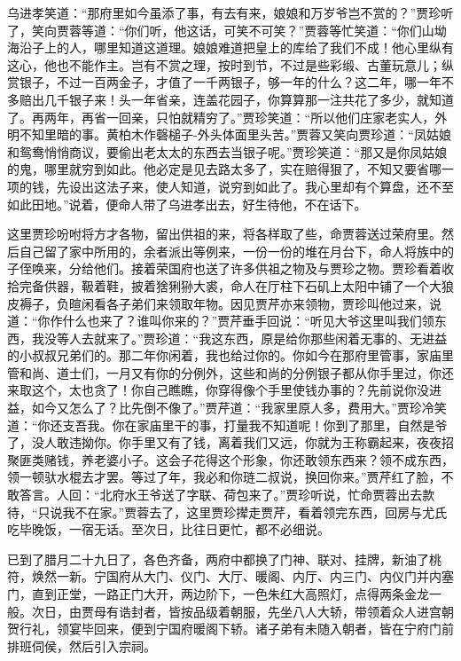 \documentclass[12pt,oneside]{book}
\begin{document}
乌进孝笑道：“那府里如今虽添了事，有去有来，娘娘和万岁爷岂不赏的？”贾珍听了，笑向贾蓉等道：“你们听，他这话，可笑不可笑？”贾蓉等忙笑道：“你们山坳海沿子上的人，哪里知道这道理。娘娘难道把皇上的库给了我们不成！他心里纵有这心，他也不能作主。岂有不赏之理，按时到节，不过是些彩缎、古董玩意儿；纵赏银子，不过一百两金子，才值了一千两银子，够一年的什么？这二年，哪一年不多赔出几千银子来！头一年省亲，连盖花园子，你算算那一注共花了多少，就知道了。再两年，再省一回亲，只怕就精穷了。”贾珍笑道：“所以他们庄家老实人，外明不知里暗的事。黄柏木作磬槌子-外头体面里头苦。”贾蓉又笑向贾珍道：“凤姑娘和鸳鸯悄悄商议，要偷出老太太的东西去当银子呢。”贾珍笑道：“那又是你凤姑娘的鬼，哪里就穷到如此。他必定是见去路太多了，实在赔得狠了，不知又要省哪一项的钱，先设出这法子来，使人知道，说穷到如此了。我心里却有个算盘，还不至如此田地。”说着，便命人带了乌进孝出去，好生待他，不在话下。

这里贾珍吩咐将方才各物，留出供祖的来，将各样取了些，命贾蓉送过荣府里。然后自己留了家中所用的，余者派出等例来，一份一份的堆在月台下，命人将族中的子侄唤来，分给他们。接着荣国府也送了许多供祖之物及与贾珍之物。贾珍看着收拾完备供器，靸着鞋，披着猞猁狲大裘，命人在厅柱下石矶上太阳中铺了一个大狼皮褥子，负暄闲看各子弟们来领取年物。因见贾芹亦来领物，贾珍叫他过来，说道：“你作什么也来了？谁叫你来的？”贾芹垂手回说：“听见大爷这里叫我们领东西，我没等人去就来了。”贾珍道：“我这东西，原是给你那些闲着无事的、无进益的小叔叔兄弟们的。那二年你闲着，我也给过你的。你如今在那府里管事，家庙里管和尚、道士们，一月又有你的分例外，这些和尚的分例银子都从你手里过，你还来取这个，太也贪了！你自己瞧瞧，你穿得像个手里使钱办事的？先前说你没进益，如今又怎么了？比先倒不像了。”贾芹道：“我家里原人多，费用大。”贾珍冷笑道：“你还支吾我。你在家庙里干的事，打量我不知道呢！你到了那里，自然是爷了，没人敢违拗你。你手里又有了钱，离着我们又远，你就为王称霸起来，夜夜招聚匪类赌钱，养老婆小子。这会子花得这个形象，你还敢领东西来？领不成东西，领一顿驮水棍去才罢。等过了年，我必和你琏二叔说，换回你来。”贾芹红了脸，不敢答言。人回：“北府水王爷送了字联、荷包来了。”贾珍听说，忙命贾蓉出去款待，“只说我不在家。”贾蓉去了，这里贾珍撵走贾芹，看着领完东西，回房与尤氏吃毕晚饭，一宿无话。至次日，比往日更忙，都不必细说。

已到了腊月二十九日了，各色齐备，两府中都换了门神、联对、挂牌，新油了桃符，焕然一新。宁国府从大门、仪门、大厅、暖阁、内厅、内三门、内仪门并内塞门，直到正堂，一路正门大开，两边阶下，一色朱红大高照灯，点得两条金龙一般。次日，由贾母有诰封者，皆按品级着朝服，先坐八人大轿，带领着众人进宫朝贺行礼，领宴毕回来，便到宁国府暖阁下轿。诸子弟有未随入朝者，皆在宁府门前排班伺侯，然后引入宗祠。
\end{document}
